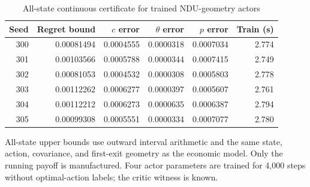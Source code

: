 \begin{table}[htbp]
\centering\small
\caption{All-state continuous certificate for trained NDU-geometry actors}\label{r8:tab:geometry}
\begin{tabular}{@{}rrrrrr@{}}
\toprule
Seed & Regret bound & $c$ error & $\theta$ error & $p$ error & Train (s) \\
\midrule
300 & 0.00081494 & 0.0004555 & 0.0000318 & 0.0007034 & 2.774 \\
301 & 0.00103566 & 0.0005788 & 0.0000344 & 0.0007415 & 2.749 \\
302 & 0.00081053 & 0.0004532 & 0.0000308 & 0.0005803 & 2.778 \\
303 & 0.00112262 & 0.0006277 & 0.0000397 & 0.0005607 & 2.761 \\
304 & 0.00112212 & 0.0006273 & 0.0000635 & 0.0006387 & 2.794 \\
305 & 0.00099308 & 0.0005551 & 0.0000334 & 0.0007077 & 2.780 \\
\bottomrule
\end{tabular}
\par\smallskip\footnotesize All-state upper bounds use outward interval arithmetic and the same state, action, covariance, and first-exit geometry as the economic model. Only the running payoff is manufactured. Four actor parameters are trained for 4,000 steps without optimal-action labels; the critic witness is known.
\end{table}
